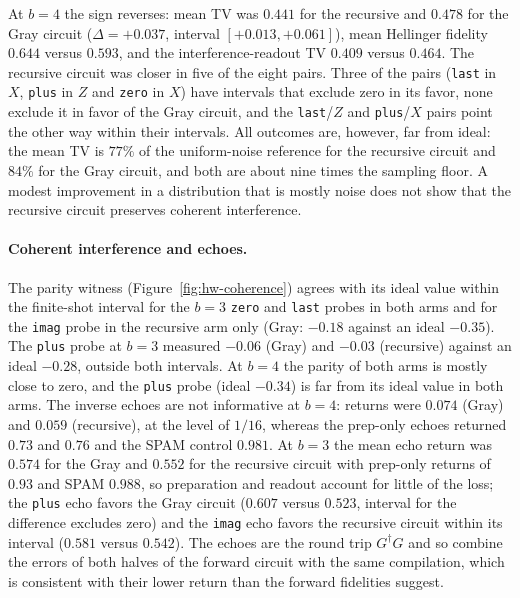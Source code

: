 \documentclass[11pt]{article}
\begin{document}
At $b=4$ the sign reverses: mean TV was $0.441$ for the recursive and $0.478$ for the Gray circuit ($\Delta=+0.037$, interval $[+0.013,+0.061]$), mean Hellinger fidelity $0.644$ versus $0.593$, and the interference-readout TV $0.409$ versus $0.464$. The recursive circuit was closer in five of the eight pairs. Three of the pairs (\texttt{last} in $X$, \texttt{plus} in $Z$ and \texttt{zero} in $X$) have intervals that exclude zero in its favor, none exclude it in favor of the Gray circuit, and the \texttt{last}/$Z$ and \texttt{plus}/$X$ pairs point the other way within their intervals. All outcomes are, however, far from ideal: the mean TV is $77\%$ of the uniform-noise reference for the recursive circuit and $84\%$ for the Gray circuit, and both are about nine times the sampling floor. A modest improvement in a distribution that is mostly noise does not show that the recursive circuit preserves coherent interference.

\paragraph{Coherent interference and echoes.} The parity witness (Figure~\ref{fig:hw-coherence}) agrees with its ideal value within the finite-shot interval for the $b=3$ \texttt{zero} and \texttt{last} probes in both arms and for the \texttt{imag} probe in the recursive arm only (Gray: $-0.18$ against an ideal $-0.35$). The \texttt{plus} probe at $b=3$ measured $-0.06$ (Gray) and $-0.03$ (recursive) against an ideal $-0.28$, outside both intervals. At $b=4$ the parity of both arms is mostly close to zero, and the \texttt{plus} probe (ideal $-0.34$) is far from its ideal value in both arms. The inverse echoes are not informative at $b=4$: returns were $0.074$ (Gray) and $0.059$ (recursive), at the level of $1/16$, whereas the prep-only echoes returned $0.73$ and $0.76$ and the SPAM control $0.981$. At $b=3$ the mean echo return was $0.574$ for the Gray and $0.552$ for the recursive circuit with prep-only returns of $0.93$ and SPAM $0.988$, so preparation and readout account for little of the loss; the \texttt{plus} echo favors the Gray circuit ($0.607$ versus $0.523$, interval for the difference excludes zero) and the \texttt{imag} echo favors the recursive circuit within its interval ($0.581$ versus $0.542$). The echoes are the round trip $G^\dagger G$ and so combine the errors of both halves of the forward circuit with the same compilation, which is consistent with their lower return than the forward fidelities suggest.
\end{document}
